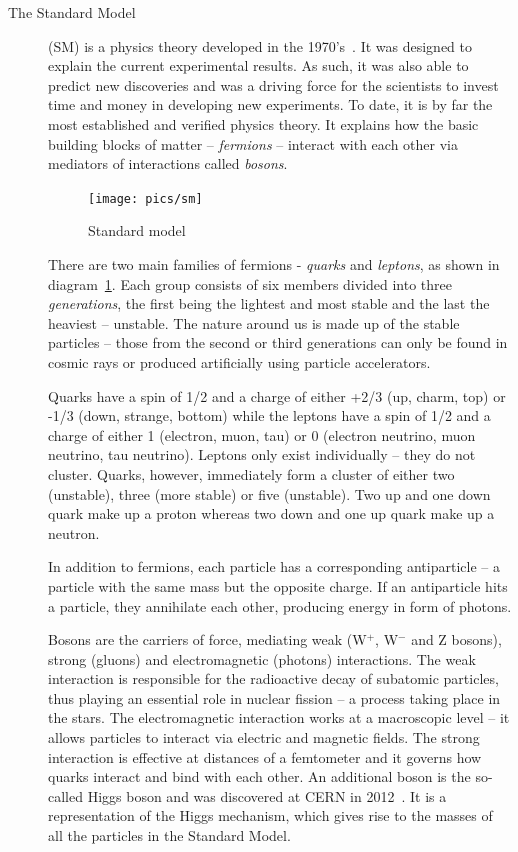 \documentclass[twoside,12pt]{packages/mytustyle}  %
\begin{document}
\begin{description}
\item[The Standard Model]
(SM) is a physics theory developed in the 1970's~\cite{Novaes:1999yn}. It was designed to explain the current experimental results. As such, it was also able to predict new discoveries and was a driving force for the scientists to invest time and money in developing new experiments. To date, it is by far the most established and verified physics theory. It explains how the basic building blocks of matter -- \emph{fermions} -- interact with each other via mediators of interactions called \emph{bosons}.  
\begin{figure}[!t]
\centering
\texttt{[image: pics/sm]}
\caption{Standard model \cite{Dominguez:2002395}}
\label{fig:sm}
\end{figure}
There are two main families of fermions - \emph{quarks} and \emph{leptons}, as shown in diagram~\ref{fig:sm}. Each group consists of six members divided into three \emph{generations}, the first being the lightest and most stable and the last the heaviest -- unstable. The nature around us is made up of the stable particles -- those from the second or third generations can only be found in cosmic rays or produced artificially using particle accelerators.

Quarks have a spin of 1/2 and a charge of either +2/3 (up, charm, top)  or -1/3  (down, strange, bottom) while the leptons have a spin of 1/2  and a charge of either 1 (electron, muon, tau) or 0 (electron neutrino, muon neutrino, tau neutrino). Leptons only exist individually -- they do not cluster. Quarks, however, immediately form a cluster of either two (unstable), three (more stable) or five (unstable). Two up and one down quark make up a proton whereas two down and one up quark make up a neutron.

In addition to fermions, each particle has a corresponding antiparticle -- a particle with the same mass but the opposite charge. If an antiparticle hits a particle, they annihilate each other, producing energy in form of photons. 

Bosons are the carriers of force, mediating weak (W$^+$, W$^-$ and Z bosons), strong (gluons) and electromagnetic (photons) interactions. The weak interaction is responsible for the radioactive decay of subatomic particles, thus playing an essential role in nuclear fission -- a process taking place in the stars. The electromagnetic interaction works at a macroscopic level -- it allows particles to interact via electric and magnetic fields. The strong interaction is effective at distances of a femtometer and it governs how quarks interact and bind with each other. An additional boson is the so-called Higgs boson and was discovered at CERN in 2012~\cite{}. It is a representation of the Higgs mechanism, which gives rise to the masses of all the particles in the Standard Model.
\end{description}
\end{document}

